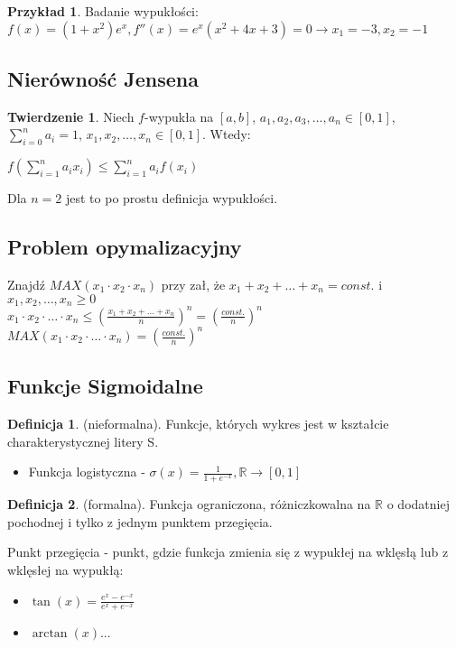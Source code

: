 \documentclass{article}
\theoremstyle{definition}
\newtheorem{de}{Definicja}[subsection]
\theoremstyle{definition}
\newtheorem{tw}{Twierdzenie}[subsection]
\theoremstyle{definition}
\newtheorem{pk}{Przykład}[subsection]
\theoremstyle{definition}
\begin{document}
\begin{pk}
    Badanie wypukłości:\\
    $f(x)=(1+x^2)e^x, f''(x)=e^x(x^2+4x+3)=0\rightarrow x_1=-3, x_2 = -1$
\end{pk}

\subsection{Nierówność Jensena}

\begin{tw}
    Niech $f$-wypukła na $[a,b]$, $a_1,a_2,a_3,\dots,a_n\in[0,1]$, $\sum_{i=0}^{n} a_i = 1$, $x_1, x_2,\dots, x_n\in[0,1]$. Wtedy:
    \begin{center}
        $f\left(\sum_{i=1}^{n} a_ix_i\right) \leq \sum_{i=1}^{n} a_i f(x_i)$
    \end{center}
    Dla $n=2$ jest to po prostu definicja wypukłości.
\end{tw}

\subsection{Problem opymalizacyjny}
Znajdź $MAX(x_1\cdot x_2\cdot x_n)$ przy zał, że $x_1+x_2+\dots+x_n=const.$ i $x_1, x_2, \dots, x_n \geq 0$\\
$x_1\cdot x_2\cdot \dots \cdot x_n \leq \left(\frac{x_1+x_2+\dots+x_n}{n}\right)^n=\left(\frac{const.}{n}\right)^n$\\
$MAX(x_1\cdot x_2\cdot \dots \cdot x_n) = \left(\frac{const.}{n}\right)^n$

\subsection{Funkcje Sigmoidalne}

\begin{de}
    (nieformalna). Funkcje, których wykres jest w kształcie charakterystycznej litery S.
    \begin{itemize}
        \item Funkcja logistyczna - $\sigma(x)=\frac{1}{1+e^{-x}}, \mathbb{R}\rightarrow[0,1]$
    \end{itemize}
\end{de}

\begin{de}
    (formalna). Funkcja ograniczona, różniczkowalna na $\mathbb{R}$ o dodatniej pochodnej i tylko z jednym punktem przegięcia.
\end{de}
Punkt przegięcia - punkt, gdzie funkcja zmienia się z wypukłej na wklęsłą lub z wklęsłej na wypukłą:
\begin{itemize}
    \item $\tan(x) = \frac{e^x-e^{-x}}{e^x+e^{-x}}$
    \item $\arctan(x)$...
\end{itemize}
\end{document}
